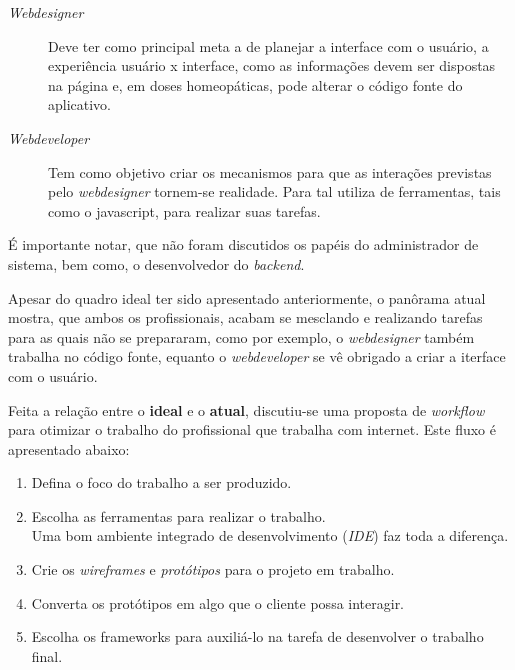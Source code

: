 \documentclass[a4paper]{report}
\begin{document}
        \begin{description}

            \item[\emph{Webdesigner}] Deve ter como principal meta a de planejar
            a interface com o usu\'{a}rio, a experi\^{e}ncia usu\'{a}rio x
            interface, como as informa\c{c}\~{o}es devem ser dispostas na
            p\'{a}gina e, em doses homeop\'{a}ticas, pode alterar o c\'{o}digo
            fonte do aplicativo.

            \item[\emph{Webdeveloper}] Tem como objetivo criar os mecanismos para
            que as intera\c{c}\~{o}es previstas pelo \emph{webdesigner} tornem-se
            realidade. Para tal utiliza de ferramentas, tais como o javascript,
            para realizar suas tarefas.

        \end{description}

        \'{E} importante notar, que n\~{a}o foram discutidos os pap\'{e}is do
        administrador de sistema, bem como, o desenvolvedor do \emph{backend}.

        Apesar do quadro ideal ter sido apresentado anteriormente, o pan\^{o}rama
        atual mostra, que ambos os profissionais, acabam se mesclando e
        realizando tarefas para as quais n\~{a}o se prepararam, como por exemplo,
        o \emph{webdesigner} tamb\'{e}m trabalha no c\'{o}digo fonte, equanto o
        \emph{webdeveloper} se v\^{e} obrigado a criar a iterface com o
        usu\'{a}rio.

        Feita a rela\c{c}\~{a}o entre o \textbf{ideal} e o \textbf{atual},
        discutiu-se uma proposta de \emph{workflow} para otimizar o trabalho do
        profissional que trabalha com internet. Este fluxo \'{e} apresentado
        abaixo:

        \begin{enumerate}

            \item Defina o foco do trabalho a ser produzido.

            \item Escolha as ferramentas para realizar o trabalho.
                \\Uma bom ambiente integrado de desenvolvimento (\emph{IDE})
                faz toda a diferen\c{c}a.

            \item Crie os \emph{wireframes} e \emph{prot\'{o}tipos} para o
            projeto em trabalho.

            \item Converta os prot\'{o}tipos em algo que o cliente possa
            interagir.

            \item Escolha os frameworks para auxili\'{a}-lo na tarefa de
            desenvolver o trabalho final.

        \end{enumerate}
\end{document}
